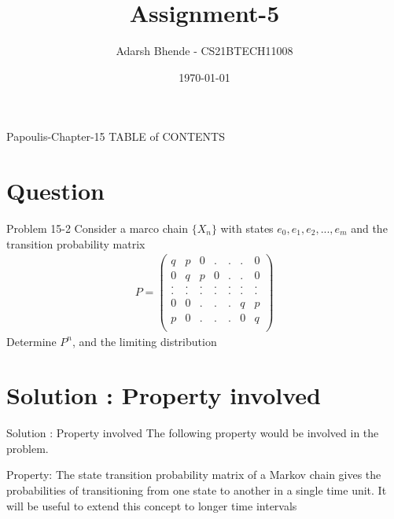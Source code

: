 \documentclass{beamer}
\title{Assignment-5}
\author{Adarsh Bhende - CS21BTECH11008}
\date{\today}
\begin{document}
\begin{frame}
    \titlepage 
\end{frame}

\logo{}


\begin{frame}{Papoulis-Chapter-15}
TABLE of CONTENTS
    \tableofcontents
\end{frame}


\section{Question}
\begin{frame}{Problem 15-2}
 Consider  a  marco chain $\{X_n\}$  with states $e_0,e_1,e_2,...,e_m$ and the transition probability matrix\\
\begin{align*}
P=\begin{pmatrix}
q&p&0&.&.&.&0\\
0&q&p&0&.&.&0\\
.&.&.&.&.&.&.\\
.&.&.&.&.&.&.\\
0&0&.&.&.&q&p\\
p&0&.&.&.&0&q\\
\end{pmatrix}
\end{align*}
Determine $P^{n}$, and the limiting distribution
\end{frame}

\section{Solution : Property involved}
\begin{frame}{Solution : Property involved}
The following property would be involved in the problem.\\
\begin{block}{Property:}
The state transition probability matrix of a Markov chain gives the probabilities of transitioning from one state to another in a single time unit. It will be useful to extend this concept to longer time intervals
    \end{block}
\end{frame}


\end{document}
